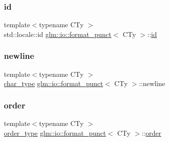 \subsubsection{\texorpdfstring{id}{id}}
{\footnotesize\ttfamily template$<$typename C\+Ty $>$ \\
std\+::locale\+::id \hyperlink{classglm_1_1io_1_1format__punct}{glm\+::io\+::format\+\_\+punct}$<$ C\+Ty $>$\+::\hyperlink{_s_d_l__opengl__glext_8h_a58c2a664503e14ffb8f21012aabff3e9}{id}\hspace{0.3cm}{\ttfamily [static]}}

\mbox{\label{classglm_1_1io_1_1format__punct_a8ddf8abdb0ebbdbb7eca08d7a777956e}} 
\subsubsection{\texorpdfstring{newline}{newline}}
{\footnotesize\ttfamily template$<$typename C\+Ty $>$ \\
\hyperlink{classglm_1_1io_1_1format__punct_ae94c42484a4c5258ad7b2f0f029efdf3}{char\+\_\+type} \hyperlink{classglm_1_1io_1_1format__punct}{glm\+::io\+::format\+\_\+punct}$<$ C\+Ty $>$\+::newline}

\mbox{\label{classglm_1_1io_1_1format__punct_a9de1f3b7120a036ec0ab394d2036d0aa}} 
\subsubsection{\texorpdfstring{order}{order}}
{\footnotesize\ttfamily template$<$typename C\+Ty $>$ \\
\hyperlink{namespaceglm_1_1io_a3497781803fe594a37177e05ab2a795f}{order\+\_\+type} \hyperlink{classglm_1_1io_1_1format__punct}{glm\+::io\+::format\+\_\+punct}$<$ C\+Ty $>$\+::\hyperlink{structglm_1_1io_1_1order}{order}}

\mbox{\label{classglm_1_1io_1_1format__punct_a5a15d396b7c963df9dec5e124236dc02}} 
